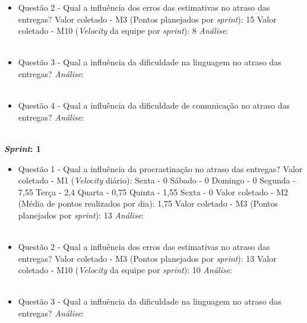 \begin{apendicesenv}
\begin{itemize}
	  \item Questão 2 - Qual a influência dos erros das estimativas no atraso das entregas? 
	    \subitem Valor coletado - M3 (Pontos planejados por \textit{sprint}): 15
	    \subitem Valor coletado - M10 (\textit{Velocity} da equipe por \textit{sprint}): 8
	    \subitem \textit{Análise}:
	    \\
	    \\
	    
	  \item Questão 3 - Qual a influência da dificuldade na linguagem no atraso das entregas?
	    \subitem \textit{Análise}:
	  \\
	  \\
	  
	  \item Questão 4 - Qual a influência da dificuldade de comunicação no atraso das entregas?
	    \subitem \textit{Análise}:
	  \\
	  \\
	  
	\end{itemize}
	    \vfill
	    \pagebreak
	\textbf{\textit{Sprint}: 1}
	
	\begin{itemize}
	  
	  \item Questão 1 - Qual a influência da procrastinação no atraso das entregas?
	    \subitem Valor coletado - M1 (\textit{Velocity} diário):
	      \subsubitem Sexta - 0
	      \subsubitem Sábado - 0
	      \subsubitem Domingo - 0
	      \subsubitem Segunda - 7,55
	      \subsubitem Terça - 2,4 
	      \subsubitem Quarta - 0,75 
	      \subsubitem Quinta - 1,55
	      \subsubitem Sexta - 0
	    \subitem Valor coletado - M2 (Média de pontos realizados por dia): 1,75
	    \subitem Valor coletado - M3 (Pontos planejados por \textit{sprint}): 13
	    \subitem \textit{Análise}:
	    \\
	    \\

	  \item Questão 2 - Qual a influência dos erros das estimativas no atraso das entregas? 
	    \subitem Valor coletado - M3 (Pontos planejados por \textit{sprint}): 13
	    \subitem Valor coletado - M10 (\textit{Velocity} da equipe por \textit{sprint}): 10
	    \subitem \textit{Análise}:
	    \\
	    \\
	    
	  \item Questão 3 - Qual a influência da dificuldade na linguagem no atraso das entregas?
	    \subitem \textit{Análise}:
	  \\
	  \\
	  

\end{itemize}
\end{apendicesenv}
